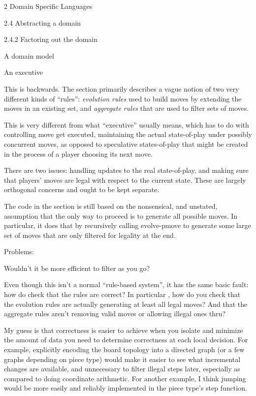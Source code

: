 \documentclass[12pt]{PalisadesLakesBook}
\begin{document}
\begin{plSection}{2 Domain Specific Languages}
\begin{plSection}{2.4 Abstracting a domain}
\begin{plSection}{2.4.2 Factoring out the domain}
\begin{plSection}{A domain model}
\end{plSection}%
\begin{plSection}{An executive}

This is backwards. 
The section primarily describes a vague notion 
of two very different kinds of 
``rules'': 
\emph{evolution rules} 
used to build moves by extending the moves in an existing set,
and \emph{aggregate rules} that are used to filter sets of moves.

This is very different from what ``executive'' usually means,
which has to do with controlling move get executed,
maintaining the actual state-of-play under possibly
concurrent moves,
as opposed to speculative states-of-play that might be created
in the process of a player choosing its next move.

There are two issues: handling updates to the real state-of-play,
and making sure that players' moves are legal with respect to
the current state.
These are largely orthogonal concerns 
and ought to be kept separate.

The code in the section is still based on the nonsensical,
and unstated, assumption that the only way to proceed is 
to generate all possible moves.
In particular, it does that by recursively calling
{\schemeFont evolve-pmove} to generate some large set of moves
that are only filtered for legality at the end.

Problems:

Wouldn't it be more efficient to filter as you go?

Even though this isn't a normal ``rule-based system'', it has the
same basic fault: how do check that the rules are correct?
In particular , how do you check that the evolution rules 
are actually generating at least all legal moves?
And that the aggregate rules aren't removing valid moves
or allowing illegal ones thru?

My guess is that correctness is easier to achieve 
when you isolate and minimize the amount of data you need
to determine correctness at each local decision.
For example, explicitly encoding the board topology
into a directed graph (or a few graphs depending on piece type)
would make it easier 
to see what incremental changes are available,
and unnecessary to filter illegal steps later,
especially as compared to doing coordinate arithmetic.
For another example, I think jumping would be 
more easily and reliably implemented 
in the piece type's step function.


\end{plSection}
\end{plSection}
\end{plSection}
\end{plSection}
\end{document}
